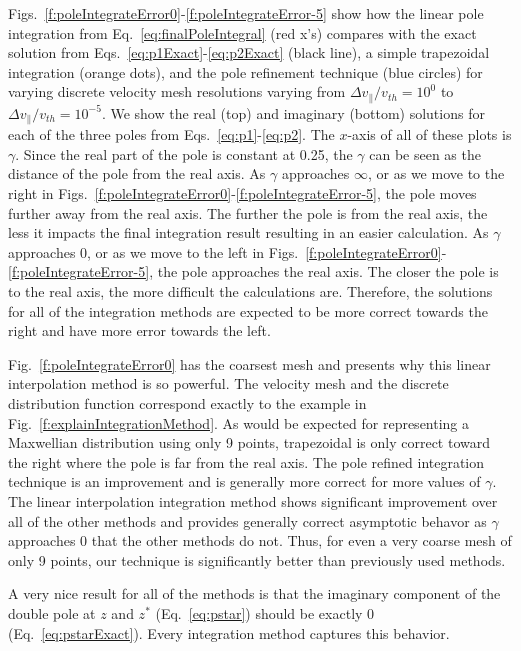Figs.~\ref{f:poleIntegrateError0}-\ref{f:poleIntegrateError-5} show how the linear pole integration from Eq.~\ref{eq:finalPoleIntegral} (red x's) compares with the exact solution from Eqs.~\ref{eq:p1Exact}-\ref{eq:p2Exact} (black line), a simple trapezoidal integration (orange dots), and the pole refinement technique \citep{longley2024} (blue circles) for varying discrete velocity mesh resolutions varying from $\Delta v_\parallel/v_{th}=10^0$ to $\Delta v_\parallel/v_{th}=10^{-5}$.
We show the real (top) and imaginary (bottom) solutions for each of the three poles from Eqs.~\ref{eq:p1}-\ref{eq:p2}.
The $x$-axis of all of these plots is $\gamma$. 
Since the real part of the pole is constant at 0.25, the $\gamma$ can be seen as the distance of the pole from the real axis.
As $\gamma$ approaches $\infty$, or as we move to the right in Figs.~\ref{f:poleIntegrateError0}-\ref{f:poleIntegrateError-5}, the pole moves further away from the real axis.
The further the pole is from the real axis, the less it impacts the final integration result resulting in an easier calculation.
As $\gamma$ approaches 0, or as we move to the left in Figs.~\ref{f:poleIntegrateError0}-\ref{f:poleIntegrateError-5}, the pole approaches the real axis.
The closer the pole is to the real axis, the more difficult the calculations are.
Therefore, the solutions for all of the integration methods are expected to be more correct towards the right and have more error towards the left.

Fig.~\ref{f:poleIntegrateError0} has the coarsest mesh and presents why this linear interpolation method is so powerful.
The velocity mesh and the discrete distribution function correspond exactly to the example in Fig.~\ref{f:explainIntegrationMethod}.
As would be expected for representing a Maxwellian distribution using only 9 points, trapezoidal is only correct toward the right where the pole is far from the real axis.
The pole refined integration technique is an improvement and is generally more correct for more values of $\gamma$.
The linear interpolation integration method shows significant improvement over all of the other methods and provides generally correct asymptotic behavor as $\gamma$ approaches 0 that the other methods do not.
Thus, for even a very coarse mesh of only 9 points, our technique is significantly better than previously used methods.


A very nice result for all of the methods is that the imaginary component of the double pole at $z$ and $z^*$ (Eq.~\ref{eq:pstar}) should be exactly 0 (Eq.~\ref{eq:pstarExact}).
Every integration method captures this behavior.


